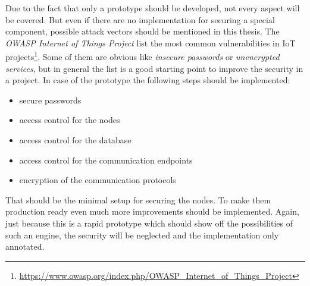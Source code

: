 Due to the fact that only a prototype should be developed, not every aspect will be covered.
But even if there are no implementation for securing a special component, possible attack vectors should be mentioned in this thesis.
The \textit{OWASP Internet of Things Project} list the most common vulnerabilities in \ac{IoT} projects\footnote{\url{https://www.owasp.org/index.php/OWASP_Internet_of_Things_Project}}.
Some of them are obvious like \textit{insecure passwords} or \textit{unencrypted services}, but in general the list is a good starting point to improve the security in a project.
In case of the prototype the following steps should be implemented:
\begin{itemize}
  \item secure passwords
  \item access control for the nodes
  \item access control for the database
  \item access control for the communication endpoints
  \item encryption of the communication protocols
\end{itemize}

That should be the minimal setup for securing the nodes.
To make them production ready even much more improvements should be implemented.
Again, just because this is a rapid prototype which should show off the possibilities of such an engine, the security will be neglected and the implementation only annotated.
